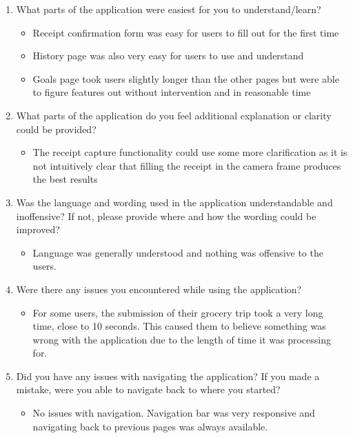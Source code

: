 \documentclass[12pt, titlepage]{article}
\begin{document}
\begin{enumerate}
  \item What parts of the application were easiest for you to understand/learn?
    \begin{itemize}
      \item Receipt confirmation form was easy for users to fill out for the first time
      \item History page was also very easy for users to use and understand
      \item Goals page took users slightly longer than the other pages but were able to figure features
      out without intervention and in reasonable time
    \end{itemize}
  \item What parts of the application do you feel additional explanation or clarity could be provided?
    \begin{itemize}
      \item The receipt capture functionality could use some more clarification as it is not intuitively
      clear that filling the receipt in the camera frame produces the best results
    \end{itemize}
  \item Was the language and wording used in the application understandable and inoffensive? If not, please
  provide where and how the wording could be improved?
    \begin{itemize}
      \item Language was generally understood and nothing was offensive to the users.
    \end{itemize}
  \item Were there any issues you encountered while using the application?
    \begin{itemize}
      \item For some users, the submission of their grocery trip took a very long time, close to 10 seconds.
      This caused them to believe something was wrong with the application due to the length of time it was processing
      for.
    \end{itemize}
  \item Did you have any issues with navigating the application? If you made a mistake, were you able to navigate
  back to where you started?
    \begin{itemize}
      \item No issues with navigation. Navigation bar was very responsive and navigating back to previous
      pages was always available.

\end{itemize}
\end{enumerate}
\end{document}
